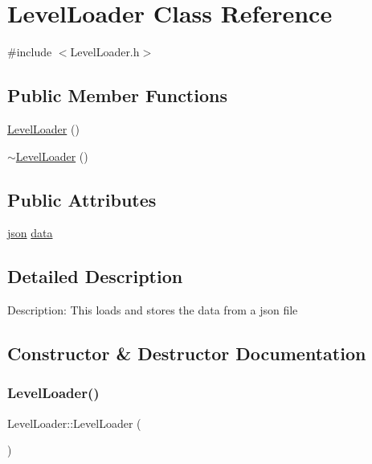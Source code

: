 \hypertarget{class_level_loader}{}\section{Level\+Loader Class Reference}
\label{class_level_loader}


{\ttfamily \#include $<$Level\+Loader.\+h$>$}

\subsection*{Public Member Functions}
\begin{DoxyCompactItemize}
\item 
\mbox{\hyperlink{class_level_loader_a2aa6f1f2116e8ded74f8f88cf26dbc20}{Level\+Loader}} ()
\item 
\mbox{\hyperlink{class_level_loader_af91d5b5441640c5be1ef096e9dfb84e8}{$\sim$\+Level\+Loader}} ()
\end{DoxyCompactItemize}
\subsection*{Public Attributes}
\begin{DoxyCompactItemize}
\item 
\mbox{\hyperlink{_level_loader_8h_ab701e3ac61a85b337ec5c1abaad6742d}{json}} \mbox{\hyperlink{class_level_loader_a829b2c5c0b8f6a3247e2c89cbbcf280c}{data}}
\end{DoxyCompactItemize}


\subsection{Detailed Description}
Description\+: This loads and stores the data from a json file 

\subsection{Constructor \& Destructor Documentation}
\mbox{\label{class_level_loader_a2aa6f1f2116e8ded74f8f88cf26dbc20}} 
\subsubsection{\texorpdfstring{LevelLoader()}{LevelLoader()}}
{\footnotesize\ttfamily Level\+Loader\+::\+Level\+Loader (\begin{DoxyParamCaption}{ }\end{DoxyParamCaption})}

